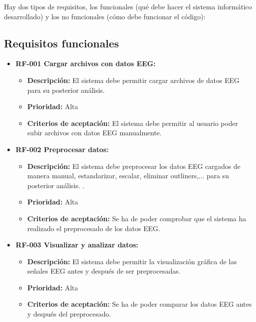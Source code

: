 Hay dos tipos de requisitos, los funcionales (qué debe hacer el sistema informático desarrollado) y los no funcionales (cómo debe funcionar el código): 

\subsection{Requisitos funcionales}

\begin{itemize}
\tightlist
\item
  \textbf{RF-001 Cargar archivos con datos EEG:}
 
  \begin{itemize}
  \tightlist
  \item
   \textbf{Descripción:} El sistema debe permitir cargar archivos de datos EEG para su posterior análisis.
  \item
   \textbf{Prioridad:} Alta
  \item
   \textbf{Criterios de aceptación:} El sistema debe permitir al usuario poder subir archivos con datos EEG manualmente. 
  \end{itemize}


\item
  \textbf{RF-002 Preprocesar datos:}
  
  \begin{itemize}
  \tightlist
  \item
    \textbf{Descripción:} El sistema debe preprocesar los datos EEG cargados de manera manual, estandarizar, escalar, eliminar outliners,... para su posterior análisis.
.
  \item
   \textbf{Prioridad:} Alta
  \item
   \textbf{Criterios de aceptación:} Se ha de poder comprobar que el sistema ha realizado el preprocesado de los datos EEG.
  \end{itemize}
 
  
\item
  \textbf{RF-003 Visualizar y analizar datos:}

  \begin{itemize}
  \tightlist
  \item
    \textbf{Descripción:} El sistema debe permitir la visualización gráfica de las señales EEG antes y después de ser preprocesadas.
  \item
    \textbf{Prioridad:} Alta
  \item
    \textbf{Criterios de aceptación:} Se ha de poder comparar los datos EEG antes y después del preprocesado. 
  \end{itemize}



\end{itemize}
